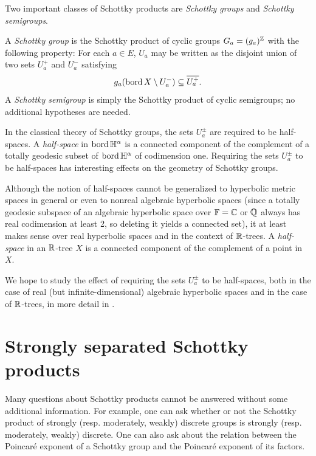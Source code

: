 Two important classes of Schottky products are \emph{Schottky groups} and \emph{Schottky semigroups}.

\begin{definition}
\label{definitionschottkygroup}
A \emph{Schottky group} is the Schottky product of cyclic groups $G_a = (g_a)^\Z$ with the following property: For each $a\in E$, $U_a$ may be written as the disjoint union of two sets $U_a^+$ and $U_a^-$ satisfying
\[
g_a(\operatorname{bord} X\setminus U_a^-) \subseteq \overline{U_a^+}.
\]
A \emph{Schottky semigroup} is simply the Schottky product of cyclic semigroups; no additional hypotheses are needed.
\end{definition}

\begin{remark}
\label{remarkhalfspace}
In the classical theory of Schottky groups, the sets $U_a^\pm$ are required to be half-spaces. A \emph{half-space} in $\bord\H^\alpha$ is a connected component of the complement of a totally geodesic subset of $\bord\H^\alpha$ of codimension one. Requiring the sets $U_a^\pm$ to be half-spaces has interesting effects on the geometry of Schottky groups.

Although the notion of half-spaces cannot be generalized to hyperbolic metric spaces in general or even to nonreal algebraic hyperbolic spaces (since a totally geodesic subspace of an algebraic hyperbolic space over $\F = \C$ or $\Q$ always has real codimension at least 2, so deleting it yields a connected set), it at least makes sense over real hyperbolic spaces and in the context of $\R$-trees. A \emph{half-space} in an $\R$-tree $X$ is a connected component of the complement of a point in $X$.

We hope to study the effect of requiring the sets $U_a^\pm$ to be half-spaces, both in the case of real (but infinite-dimensional) algebraic hyperbolic spaces and in the case of $\R$-trees, in more detail in \cite{DSU2}.
\end{remark}

\section{Strongly separated Schottky products}
Many questions about Schottky products cannot be answered without some additional information. For example, one can ask whether or not the Schottky product of strongly (resp. moderately, weakly) discrete groups is strongly (resp. moderately, weakly) discrete. One can also ask about the relation between the Poincar\'e exponent of a Schottky group and the Poincar\'e exponent of its factors. 

